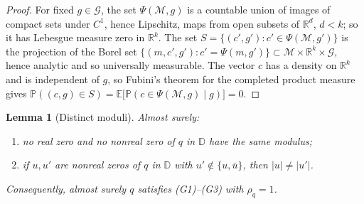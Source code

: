 \documentclass[11pt]{amsart}
\newtheorem{lemma}[theorem]{Lemma}
\theoremstyle{definition}
\theoremstyle{remark}
\numberwithin{equation}{section}
\newcommand{\R}{\mathbb{R}}
\newcommand{\D}{\mathbb{D}}
\newcommand{\E}{\mathbb{E}}
\newcommand{\PP}{\mathbb{P}}
\begin{document}
\begin{proof}
For fixed $g\in\mathcal G$, the set $\Psi(\mathcal M,g)$ is a countable union of images of compact sets under $C^1$, hence Lipschitz, maps from open subsets of $\R^d$, $d<k$; so it has Lebesgue measure zero in $\R^k$. The set $S=\{(c',g'):c'\in\Psi(\mathcal M,g')\}$ is the projection of the Borel set $\{(m,c',g'):c'=\Psi(m,g')\}\subset\mathcal M\times\R^k\times\mathcal G$, hence analytic and so universally measurable. The vector $c$ has a density on $\R^k$ and is independent of $g$, so Fubini's theorem for the completed product measure gives $\PP((c,g)\in S)=\E\bigl[\PP(c\in\Psi(\mathcal M,g)\mid g)\bigr]=0$.
\end{proof}

\begin{lemma}[Distinct moduli]\label{lem:moduli}
Almost surely:
\begin{enumerate}
\item[(a)] no real zero and no nonreal zero of $q$ in $\D$ have the same modulus;
\item[(b)] if $u,u'$ are nonreal zeros of $q$ in $\D$ with $u'\notin\{u,\bar u\}$, then $|u|\ne|u'|$.
\end{enumerate}
Consequently, almost surely $q$ satisfies (G1)--(G3) with $\rho_q=1$.
\end{lemma}
\end{document}
